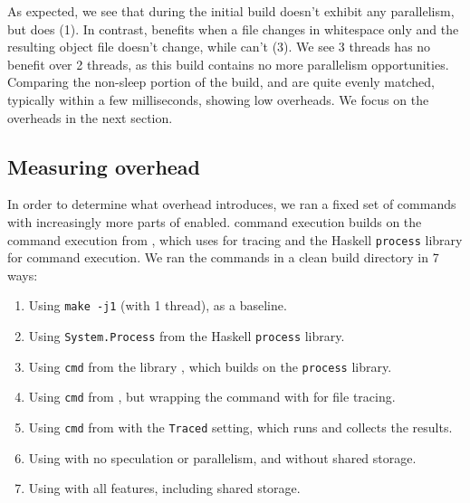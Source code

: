 As expected, we see that during the initial build \Rattle doesn't exhibit any parallelism, but \Make does (1). In contrast, \Rattle benefits when a file changes in whitespace only and the resulting object file doesn't change, while \Make can't (3). We see 3 threads has no benefit over 2 threads, as this build contains no more parallelism opportunities. Comparing the non-sleep portion of the build, \Make and \Rattle are quite evenly matched, typically within a few milliseconds, showing low overheads. We focus on the overheads in the next section.

\subsection{Measuring overhead}
\label{sec:eval:overhead}

In order to determine what overhead \Rattle introduces, we ran a fixed set of commands with increasingly more parts of \Rattle enabled. \Rattle command execution builds on the command execution from \Shake \cite{shake}, which uses \Fsatrace for tracing and the Haskell \texttt{process} library for command execution. We ran the commands in a clean build directory in 7 ways:

\begin{enumerate}
\item Using \texttt{make -j1} (\Make with 1 thread), as a baseline.
\item Using \texttt{System.Process} from the Haskell \texttt{process} library.
\item Using \texttt{cmd} from the  \Shake library \cite{shake}, which builds on  the \texttt{process} library.
\item Using \texttt{cmd} from \Shake, but wrapping the command with \Fsatrace for file tracing.
\item Using \texttt{cmd} from \Shake with the \texttt{Traced} setting, which runs \Fsatrace and collects the results.
\item Using \Rattle with no speculation or parallelism, and without shared storage.
\item Using \Rattle with all features, including shared storage.
\end{enumerate}

